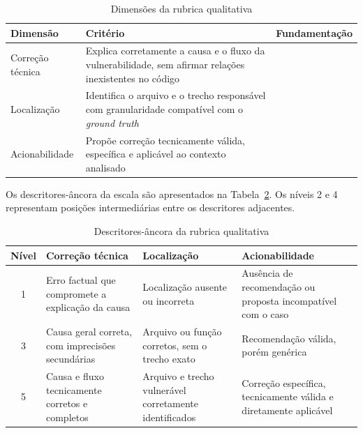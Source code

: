 \begin{table}[htb]
\ABNTEXfontereduzida
\caption{\label{tab:dimensoes-rubrica}Dimensões da rubrica qualitativa}
\centering
\begin{tabularx}{\textwidth}{|l|X|X|}
\hline
\textbf{Dimensão} & \textbf{Critério} & \textbf{Fundamentação} \\
\hline
Correção técnica & Explica corretamente a causa e o fluxo da vulnerabilidade, sem afirmar relações inexistentes no código & \cite{Mao2025ExplainableVD} \\
\hline
Localização & Identifica o arquivo e o trecho responsável com granularidade compatível com o \textit{ground truth} & \cite{Zhang2023LocateDescribe, Mao2025ExplainableVD} \\
\hline
Acionabilidade & Propõe correção tecnicamente válida, específica e aplicável ao contexto analisado & \cite{Mao2025ExplainableVD, Aloraini2019SASTWarnings} \\
\hline
\end{tabularx}
\end{table}

Os descritores-âncora da escala são apresentados na Tabela~\ref{tab:ancoras-rubrica}. Os níveis 2 e 4 representam posições intermediárias entre os descritores adjacentes.

\begin{table}[htb]
\ABNTEXfontereduzida
\caption{\label{tab:ancoras-rubrica}Descritores-âncora da rubrica qualitativa}
\centering
\begin{tabularx}{\textwidth}{|c|X|X|X|}
\hline
\textbf{Nível} & \textbf{Correção técnica} & \textbf{Localização} & \textbf{Acionabilidade} \\
\hline
1 & Erro factual que compromete a explicação da causa & Localização ausente ou incorreta & Ausência de recomendação ou proposta incompatível com o caso \\
\hline
3 & Causa geral correta, com imprecisões secundárias & Arquivo ou função corretos, sem o trecho exato & Recomendação válida, porém genérica \\
\hline
5 & Causa e fluxo tecnicamente corretos e completos & Arquivo e trecho vulnerável corretamente identificados & Correção específica, tecnicamente válida e diretamente aplicável \\
\hline
\end{tabularx}
\end{table}

